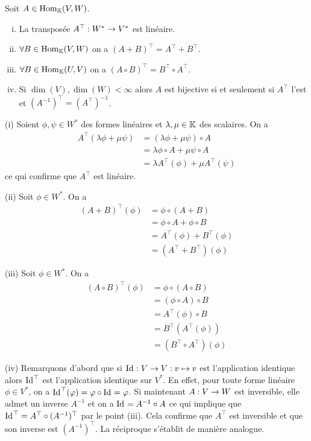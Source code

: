 \begin{theoreme}
  Soit $A \in \mathrm{Hom}_{\mathbb{K}}(V, W)$.
  \begin{enumerate}[(i)]
    \item La transposée $A^\top: W^* \rightarrow V^*$ est linéaire.
    \item $\forall B \in \mathrm{Hom}_{\mathbb{K}}(V, W)$ on a $(A+B)^\top = A^\top + B^\top$.
    \item $\forall B \in \mathrm{Hom}_{\mathbb{K}}(U, V)$ on a $(A\circ B)^\top = B^\top \circ A^\top$. 
    \item Si $\dim(V), \dim(W) < \infty$ alors $A$ est bijective si et seulement si  $A^\top$ l'est et $(A^{-1})^\top = (A^\top)^{-1}$.
  \end{enumerate}

  \tcblower
  \begin{preuve}
    (i) Soient $\phi, \psi \in W^*$ des formes linéaires et $\lambda, \mu \in \mathbb{K}$ des scalaires. On a
    \begin{align*}
      A^\top(\lambda\phi + \mu\psi) &= (\lambda\phi + \mu\psi) \circ A \\
                                    &= \lambda\phi\circ A + \mu\psi\circ A \\
                                    &= \lambda A^\top(\phi) + \mu A^\top(\psi)
    \end{align*}
    ce qui confirme que $A^\top$ est linéaire.
    \par (ii) Soit $\phi \in W^*$. On a
    \begin{align*}
      (A+B)^\top(\phi) &= \phi \circ (A+B) \\
                       &= \phi\circ A + \phi\circ B \\
                       &= A^\top(\phi) + B^\top(\phi) \\
                       &= (A^\top + B^\top)(\phi)
    \end{align*}
    \par (iii) Soit $\phi \in W^*$. On a
    \begin{align*}
      (A\circ B)^\top(\phi) &= \phi \circ (A \circ B) \\
                            &= (\phi \circ A) \circ B \\
                            &= A^\top(\phi)\circ B \\
                            &= B^\top\left(A^\top(\phi)\right) \\
                            &= (B^\top \circ A^\top)(\phi)
    \end{align*}
    \par (iv) Remarquons d'abord que si $\mathrm{Id_{}}: V \rightarrow V : v \mapsto v$ est l'application identique alors  $\mathrm{Id_{}}^\top$ est l'application identique sur  $V^*$. En effet, pour toute forme linéaire  $\phi \in V^*$, on a $\mathrm{Id_{}}^\top(\varphi) = \varphi \circ \mathrm{Id_{}} = \varphi$. Si maintenant $A: V \rightarrow W$ est inversible, elle admet un inverse $A^{-1}$ et on a $\mathrm{Id_{}} = A^{-1}\circ A$ ce qui implique que $\mathrm{Id_{}}^\top = A^\top \circ (A^{-1})^\top$ par le point (iii). Cela confirme que $A^\top$ est inversible et que son inverse est $(A^{-1})^\top$. La réciproque s'établit de manière analogue.
  \end{preuve}
\end{theoreme}

